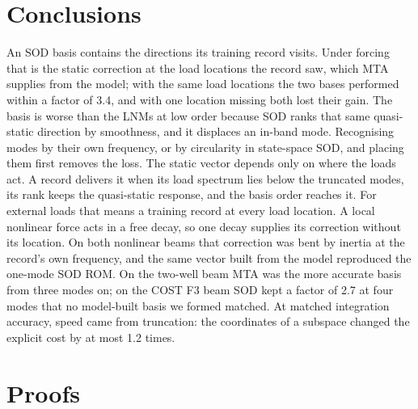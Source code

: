 \documentclass[preprint,12pt]{elsarticle}
\begin{document}
\section{Conclusions}\label{sec:concl}
An SOD basis contains the directions its training record visits. Under forcing that is the static correction at the load locations the record saw, which MTA supplies from the model; with the same load locations the two bases performed within a factor of 3.4, and with one location missing both lost their gain. The basis is worse than the LNMs at low order because SOD ranks that same quasi-static direction by smoothness, and it displaces an in-band mode. Recognising modes by their own frequency, or by circularity in state-space SOD, and placing them first removes the loss.
The static vector depends only on where the loads act. A record delivers it when its load spectrum lies below the truncated modes, its rank keeps the quasi-static response, and the basis order reaches it. For external loads that means a training record at every load location. A local nonlinear force acts in a free decay, so one decay supplies its correction without its location. On both nonlinear beams that correction was bent by inertia at the record's own frequency, and the same vector built from the model reproduced the one-mode SOD ROM. On the two-well beam MTA was the more accurate basis from three modes on; on the COST F3 beam SOD kept a factor of 2.7 at four modes that no model-built basis we formed matched. At matched integration accuracy, speed came from truncation: the coordinates of a subspace changed the explicit cost by at most 1.2 times.


\appendix
\section{Proofs}\label{app:proofs}
\end{document}
